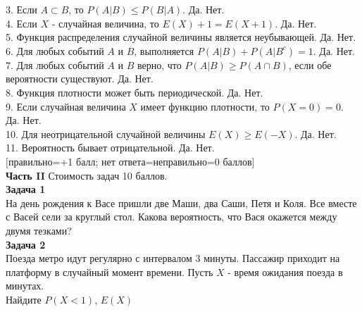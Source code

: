 \documentclass[pdftex,12pt,a4paper]{article}
\begin{document}
3. Если $A\subset B$, то $P(A|B)\le P(B|A)$. Да. Нет. \\

4. Если  $X$  - случайная величина, то $E(X)+1=E(X+1)$. Да. Нет. \\

5. Функция распределения случайной величины является неубывающей. Да. Нет. \\

6. Для любых событий $A$ и $B$, выполняется $P(A|B)+P(A|B^{c})=1$. Да. Нет. \\

7. Для любых событий  $A$  и  $B$  верно, что $P(A|B)\ge P(A\cap
B)$, если обе вероятности существуют. Да. Нет. \\

8. Функция плотности может быть периодической. Да. Нет. \\

9. Если случайная величина $X$ имеет функцию плотности, то $P(X=0)=0$. Да. Нет. \\

10. Для неотрицательной случайной величины $E(X)\ge E(-X)$. Да.
Нет. \\

11. Вероятность бывает отрицательной. Да. Нет. \\


$[$правильно=+1 балл; нет ответа=неправильно=0 баллов$]$ \\




\pagebreak \textbf{Часть II} Стоимость задач 10 баллов. \\


\textbf{Задача 1} \\ %
На день рождения к Васе пришли две Маши, два Саши, Петя и Коля. Все вместе с Васей сели за круглый стол. Какова вероятность, что Вася окажется между двумя тезками? \\


\textbf{Задача 2} \\ %
Поезда метро идут регулярно с интервалом 3 минуты. Пассажир
приходит на платформу в случайный момент времени. Пусть $X$ -
время ожидания поезда в минутах. \\
Найдите $P(X<1)$, $E(X)$ \\

\end{document}
